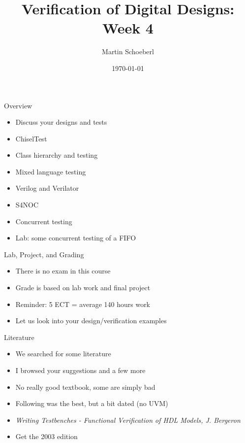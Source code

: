 

\newif\ifbook


\title{Verification of Digital Designs: Week 4}
\author{Martin Schoeberl}
\date{\today}



\begin{frame}
\titlepage
\end{frame}

\begin{frame}[fragile]{Overview}
\begin{itemize}
\item Discuss your designs and tests
\item ChiselTest
\item Class hierarchy and testing
\item Mixed language testing
\item Verilog and Verilator
\item S4NOC
\item Concurrent testing
\item Lab: some concurrent testing of a FIFO
\end{itemize}
\end{frame}

\begin{frame}[fragile]{Lab, Project, and Grading}
\begin{itemize}
\item There is no exam in this course
\item Grade is based on lab work and final project
\item Reminder: 5 ECT = average 140 hours work
\item Let us look into your design/verification examples
\end{itemize}
\end{frame}

\begin{frame}[fragile]{Literature}
\begin{itemize}
\item We searched for some literature
\item I browsed your suggestions and a few more
\item No really good textbook, some are simply bad
\item Following was the best, but a bit dated (no UVM)
\item \emph{Writing Testbenches - Functional Verification of HDL Models, J. Bergeron}
\item Get the 2003 edition
\end{itemize}
\end{frame}

